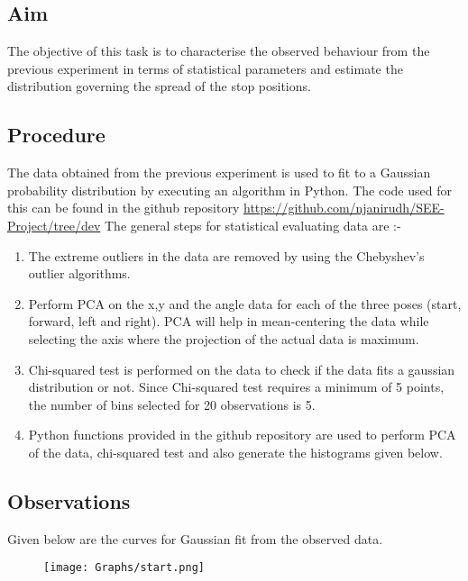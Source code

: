 \documentclass[10pt,a4paper]{article}
\begin{document}
\subsection{Aim}
\Large
The objective of this task is to characterise the observed behaviour from the previous experiment in terms of statistical parameters and estimate the distribution governing the spread of the stop positions.

\subsection{Procedure}

The data obtained from the previous experiment is used to fit to a Gaussian probability distribution by executing an algorithm in Python. The code used for this can be found in the github repository \href{https://github.com/njanirudh/SEE-Project/tree/dev}{https://github.com/njanirudh/SEE-Project/tree/dev}
The general steps for statistical evaluating data are :-
\begin{enumerate}
	\item The extreme outliers in the data are removed by using the Chebyshev's outlier algorithms. 
	\item Perform PCA on the x,y and the angle data for each of the three poses (start, forward, left and right). 
	PCA will help in mean-centering the data while selecting the axis where the projection of the actual data is maximum. 
	\item Chi-squared test is performed on the data to check if the data fits a gaussian distribution or not. 
	Since Chi-squared test requires a minimum of 5 points, the number of bins selected for 20 observations is 5.
	\item Python functions provided in the github repository are used to perform PCA of the data, chi-squared test and also generate the histograms given below.
	
\end{enumerate}
	

\subsection{Observations}
		
Given below are the curves for Gaussian fit from the observed data.


\begin{figure}[H]
	\centering
	\texttt{[image: Graphs/start.png]}
\end{figure}
\end{document}
